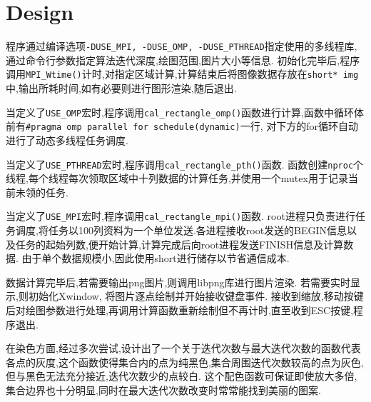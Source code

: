 \section{Design}
	程序通过编译选项\verb|-DUSE_MPI, -DUSE_OMP, -DUSE_PTHREAD|指定使用的多线程库,通过命令行参数指定算法迭代深度,绘图范围,图片大小等信息.
	初始化完毕后,程序调用\verb|MPI_Wtime()|计时,对指定区域计算,计算结束后将图像数据存放在\verb|short* img|中,输出所耗时间,如有必要则进行图形渲染,随后退出.

	当定义了\verb|USE_OMP|宏时,程序调用\verb|cal_rectangle_omp()|函数进行计算,函数中循环体前有\verb|#pragma omp parallel for schedule(dynamic)|一行,
对下方的for循环自动进行了动态多线程任务调度.
	
	当定义了\verb|USE_PTHREAD|宏时,程序调用\verb|cal_rectangle_pth()|函数.
	函数创建\verb|nproc|个线程,每个线程每次领取区域中十列数据的计算任务,并使用一个mutex用于记录当前未领的任务.
	
	当定义了\verb|USE_MPI|宏时,程序调用\verb|cal_rectangle_mpi()|函数.
	root进程只负责进行任务调度,将任务以100列资料为一个单位发送.各进程接收root发送的BEGIN信息以及任务的起始列数,便开始计算,计算完成后向root进程发送FINISH信息及计算数据.
	由于单个数据规模小,因此使用short进行储存以节省通信成本.

	数据计算完毕后,若需要输出png图片,则调用libpng库进行图片渲染.
	若需要实时显示,则初始化Xwindow, 将图片逐点绘制并开始接收键盘事件.
	接收到缩放,移动按键后对绘图参数进行处理,再调用计算函数重新绘制但不再计时,直至收到ESC按键,程序退出.

	在染色方面,经过多次尝试,设计出了一个关于迭代次数与最大迭代次数的函数代表各点的灰度,这个函数使得集合内的点为纯黑色,集合周围迭代次数较高的点为灰色,但与黑色无法充分接近,迭代次数少的点较白.
	这个配色函数可保证即使放大多倍,集合边界也十分明显,同时在最大迭代次数改变时常常能找到美丽的图案.
